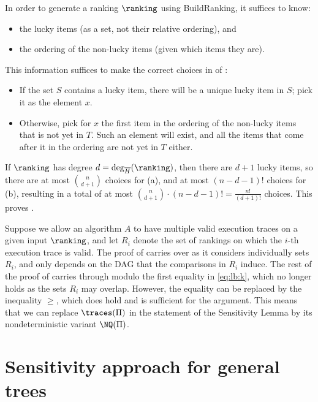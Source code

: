 In order to generate a ranking $\ranking$ using BuildRanking, it suffices to know:
\begin{itemize}
\item[(a)] the lucky items (as a set, not their relative ordering), and 
\item[(b)] the ordering of the non-lucky items (given which items they are).
\end{itemize}
This information suffices to make the correct choices in  of :
\begin{itemize}
\item 
If the set $S$ contains a lucky item, there will be a unique lucky item in  $S$; pick it as the element $x$.
\item 
Otherwise, pick for $x$ the first item in the ordering of the non-lucky items that is not yet in $T$. Such an element will exist, and all the items that come after it in the ordering are not yet in $T$ either.
\end{itemize}
If $\ranking$ has degree $d = \deg_{\overline{H}}(\ranking)$, then there are $d+1$ lucky items, so there are at most $\binom{n}{d+1}$ choices for (a), and at most $(n-d-1)!$ choices for (b), resulting in a total of at most $\binom{n}{d+1} \cdot (n-d-1)! = \frac{n!}{(d+1)!}$ choices. This proves .

\begin{remark}\label{remark:sensitivity}
Suppose we allow an algorithm $A$ to have multiple valid execution traces on a given input $\ranking$, and let $R_i$ denote the set of rankings on which the $i$-th execution trace is valid. The proof of  carries over as it considers individually sets $R_i$, and only depends on the DAG that the comparisons in $R_i$ induce. The rest of the proof of  carries through modulo the first equality in \eqref{eq:lb:k}, which no longer holds as the sets $R_i$ may overlap. However, the equality can be replaced by the inequality $\ge$, which does hold and is sufficient for the argument. This means that we can replace $\traces(\Pi)$ in the statement of the Sensitivity Lemma by its nondeterministic variant $\NQ(\Pi)$.
\end{remark}



\section{Sensitivity approach for general trees}
\label{sec:sensitivity:general}

